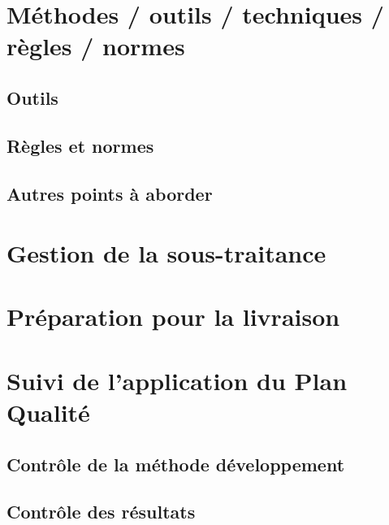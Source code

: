 \section{Méthodes / outils / techniques / règles / normes}
	\subsection{Outils}
	\subsection{Règles et normes}
	\subsection{Autres points à aborder}

\section{Gestion de la sous-traitance}

\section{Préparation pour la livraison}

\section{Suivi de l'application du Plan Qualité}
	\subsection{Contrôle de la méthode développement }
	\subsection{Contrôle des résultats}
